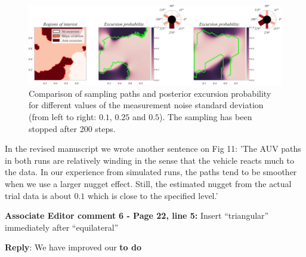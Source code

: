 \documentclass[a4paper]{article}
\newcounter{reviewer}
\def\aecom{\textbf{Associate Editor comment }}
\def\reply{\textbf{Reply}}
\begin{document}
\begin{figure}[H]
    \centering
    \includegraphics[scale=0.52]{ans_to_reviewers/merged_paths_2.png}
    \caption{Comparison of sampling paths and posterior excursion probability for different values of the measurement noise standard deviation (from left to right: $0.1$, $0.25$ and $0.5$). The sampling has been stopped after 200 steps.}
    \label{fig:nugget_comparison}
\end{figure}

\newpage

In the revised manuscript we wrote another sentence on Fig 11: 'The AUV paths in both runs are relatively winding in the sense that the vehicle reacts much to the data. In our experience from simulated runs, the paths tend to be smoother when we use a larger nugget effect. Still, the estimated nugget from the actual trial data is about $0.1$ which is close to the specified level.'

\vspace{5mm}
\noindent \aecom \textbf{6 - Page 22, line 5:}  Insert “triangular” immediately after “equilateral”

\vspace{5mm}
\reply: We have improved our {\bf{to do}} 

\vspace{1em}


\footnotesize



\end{document}
